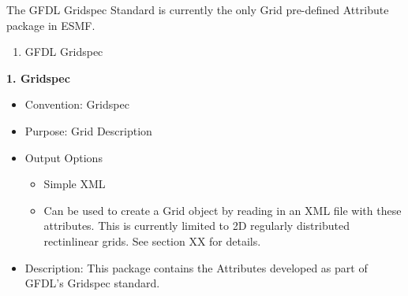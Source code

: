 The GFDL Gridspec Standard is currently the only Grid pre-defined Attribute package in ESMF.

\begin{enumerate}
    \item GFDL Gridspec
\end{enumerate}



\vspace{.25in}
{\bf 1. Gridspec}

\label{CIMFieldAttributePackages}

\begin{itemize}
    \item Convention: Gridspec
    \item Purpose: Grid Description
    \item Output Options
    \begin{itemize}
        \item Simple XML
        \item Can be used to create a Grid object by reading in an XML file with these attributes. This is currently limited to 2D regularly distributed rectinlinear grids. See section XX for details. 
    \end{itemize}
    \item Description: This package contains the Attributes developed as part of GFDL's Gridspec standard.
\end{itemize}

